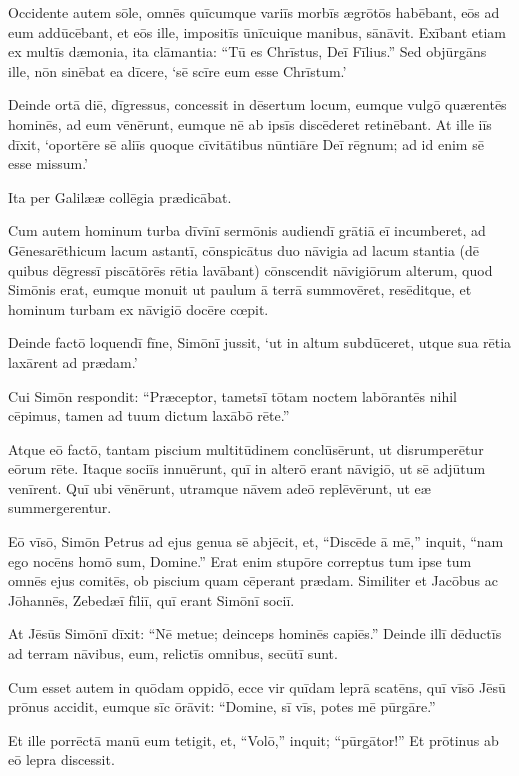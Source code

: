 \Versus Occidente autem sōle, omnēs quīcumque variīs morbīs ægrōtōs habēbant, eōs ad eum addūcēbant, et eōs ille, impositīs ūnīcuique manibus, sānāvit.
\Versus Exībant etiam ex multīs dæmonia, ita clāmantia: ``Tū es Chrīstus, Deī Fīlius.'' Sed objūrgāns ille, nōn sinēbat ea dīcere, `sē scīre eum esse Chrīstum.'

\Versus Deinde ortā diē, dīgressus, concessit in dēsertum locum, eumque vulgō quærentēs hominēs, ad eum vēnērunt, eumque nē ab ipsīs discēderet retinēbant.
\Versus At ille iīs dīxit, `oportēre sē aliīs quoque cīvitātibus nūntiāre Deī rēgnum; ad id enim sē esse missum.'

\Versus Ita per Galilææ collēgia prædicābat.



\Caput
\Versus Cum autem hominum turba dīvīnī sermōnis audiendī grātiā eī incumberet, ad Gēnesarēthicum lacum astantī,
\Versus cōnspicātus duo nāvigia ad lacum stantia (dē quibus dēgressī piscātōrēs rētia lavābant) cōnscendit nāvigiōrum alterum, quod Simōnis erat,
\Versus eumque monuit ut paulum ā terrā summovēret, resēditque, et hominum turbam ex nāvigiō docēre cœpit.

\Versus Deinde factō loquendī fīne, Simōnī jussit, `ut in altum subdūceret, utque sua rētia laxārent ad prædam.'

\Versus Cui Simōn respondit: ``Præceptor, tametsī tōtam noctem labōrantēs nihil cēpimus, tamen ad tuum dictum laxābō rēte.''

\Versus Atque eō factō, tantam piscium multitūdinem conclūsērunt, ut disrumperētur eōrum rēte.
\Versus Itaque sociīs innuērunt, quī in alterō erant nāvigiō, ut sē adjūtum venīrent. Quī ubi vēnērunt, utramque nāvem adeō replēvērunt, ut eæ summergerentur.

\Versus Eō vīsō, Simōn Petrus ad ejus genua sē abjēcit, et, ``Discēde ā mē,'' inquit, ``nam ego nocēns homō sum, Domine.''
\Versus Erat enim stupōre correptus tum ipse tum omnēs ejus comitēs, ob piscium quam cēperant prædam.
\Versus Similiter et Jacōbus ac Jōhannēs, Zebedæī fīliī, quī erant Simōnī sociī.

 At Jēsūs Simōnī dīxit: ``Nē metue; deinceps hominēs capiēs.''
\Versus Deinde illī dēductīs ad terram nāvibus, eum, relictīs omnibus, secūtī sunt.

\Versus Cum esset autem in quōdam oppidō, ecce vir quīdam leprā scatēns, quī vīsō Jēsū prōnus accidit, eumque sīc ōrāvit: ``Domine, sī vīs, potes mē pūrgāre.''

\Versus Et ille porrēctā manū eum tetigit, et, ``Volō,'' inquit; ``pūrgātor!'' Et prōtinus ab eō lepra discessit.

